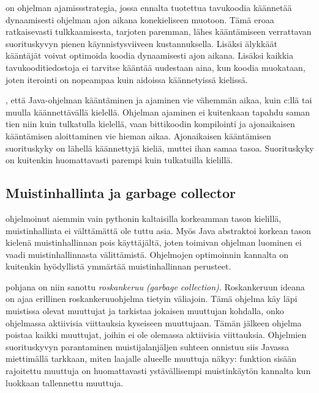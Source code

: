\documentclass{tufte-book}
\newcommand{\eng}[1]{\textit{(#1)}}
\newcommand{\new}[1]{\textit{\gls{#1}}}
\newcommand{\neweng}[2]{\new{#1} \eng{#2}}
\begin{document}
 on ohjelman ajamissstrategia, jossa ennalta tuotettua
tavukoodia käännetää dynaamisesti ohjelman ajon aikana konekieliseen muotoon. Tämä eroaa
ratkaisevasti tulkkaamisesta, tarjoten paremman, lähes kääntämiseen verrattavan suorituskyvyn
pienen käynnistysviiveen kustannuksella. Lisäksi älykkäät kääntäjät voivat optimoida koodia
dynaamisesti ajon aikana. Lisäksi kaikkia tavukooditiedostoja ei tarvitse kääntää uudestaan aina,
kun koodia muokataan, joten iterointi on nopeampaa kuin aidoissa käännetyissä kielissä.

, että Java-ohjelman kääntäminen ja ajaminen vie vähemmän aikaa, kuin
c:llä tai muulla käännettävällä kielellä. Ohjelman ajaminen ei kuitenkaan tapahdu saman tien niin
kuin tulkatulla kielellä, vaan bittikoodin kompilointi ja ajonaikaisen kääntämisen aloittaminen
vie hieman aikaa. Ajonaikaisen kääntämisen suorituskyky on lähellä käännettyjä kieliä, muttei ihan
samaa tasoa. Suorituskyky on kuitenkin huomattavasti parempi kuin tulkatuilla kielillä.

\subsection{Muistinhallinta ja garbage collector}
\label{GC}

 ohjelmoinut aiemmin vain pythonin kaltaisilla korkeamman tason kielillä,
muistinhallinta ei välttämättä ole tuttu asia. Myös Java abstraktoi korkean tason kielenä
muistinhallinnan pois käyttäjältä, joten toimivan ohjelman luominen ei vaadi muistinhallinnasta
välittämistä. Ohjelmojen optimoinnin kannalta on kuitenkin hyödyllistä ymmärtää muistinhallinnan
perusteet.

 pohjana on niin sanottu
\neweng{roskankeruu}{garbage collection}. Roskankeruun ideana on ajaa erillinen roskankeruuohjelma
tietyin väliajoin. Tämä ohjelma käy läpi muistissa olevat muuttujat ja tarkistaa jokaisen
muuttujan kohdalla, onko ohjelmassa aktiivisia viittauksia kyseiseen muuttujaan. Tämän jälkeen
ohjelma poistaa kaikki muuttujat, joihin ei ole olemassa aktiivisia viittauksia. Ohjelmien
suorituskyvyn parantaminen muistijalanjäljen suhteen onnistuu siis Javassa miettimällä tarkkaan,
miten laajalle alueelle muuttuja näkyy: funktion sisään rajoitettu muuttuja on huomattavasti
ystävällisempi muistinkäytön kannalta kun luokkaan tallennettu muuttuja.

\end{document}

